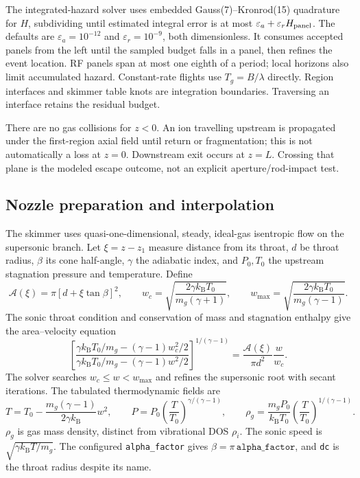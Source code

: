 \documentclass[10pt,a4paper]{article}
\newcommand{\kb}{k_{\mathrm B}}
\begin{document}
The integrated-hazard solver uses embedded Gauss(7)--Kronrod(15) quadrature
for $H$, subdividing until estimated integral error is at most
$\varepsilon_a+\varepsilon_r H_{\rm panel}$. The defaults are
$\varepsilon_a=10^{-12}$ and $\varepsilon_r=10^{-9}$, both dimensionless.
It consumes accepted panels from the left until the sampled budget falls in a
panel, then refines the event location. RF panels span at most one eighth of
a period; local horizons also limit accumulated hazard. Constant-rate flights
use $T_g=B/\lambda$ directly. Region interfaces and skimmer table knots are
integration boundaries. Traversing an interface retains the residual budget.

There are no gas collisions for $z<0$. An ion travelling upstream is propagated
under the first-region axial field until return or fragmentation; this is not
automatically a loss at $z=0$. Downstream exit occurs at $z=L$. Crossing that
plane is the modeled escape outcome, not an explicit aperture/rod-impact test.

\clearpage
\subsection{Nozzle preparation and interpolation}\label{sec:nozzle}
The skimmer uses quasi-one-dimensional, steady, ideal-gas isentropic flow on
the supersonic branch. Let $\xi=z-z_1$ measure distance from its throat,
$d$ be throat radius, $\beta$ its cone half-angle, $\gamma$ the adiabatic index,
and $P_0,T_0$ the upstream stagnation pressure and temperature. Define
\[
 \mathcal A(\xi)=\pi[d+\xi\tan\beta]^2,\qquad
 w_c=\sqrt{\frac{2\gamma\kb T_0}{m_g(\gamma+1)}},\qquad
 w_{\max}=\sqrt{\frac{2\gamma\kb T_0}{m_g(\gamma-1)}}.
\]
The sonic throat condition and conservation of mass and stagnation enthalpy
give the area--velocity equation
\begin{equation}
 \left[
 \frac{\gamma\kb T_0/m_g-(\gamma-1)w_c^2/2}
 {\gamma\kb T_0/m_g-(\gamma-1)w^2/2}
 \right]^{1/(\gamma-1)}
 =\frac{\mathcal A(\xi)}{\pi d^2}\frac{w}{w_c}.
\label{eq:nozzle}
\end{equation}
The solver searches $w_c\leq w<w_{\max}$ and refines the supersonic root with
secant iterations. The tabulated thermodynamic fields are
\[
 T=T_0-\frac{m_g(\gamma-1)}{2\gamma\kb}w^2,\qquad
 P=P_0\left(\frac T{T_0}\right)^{\gamma/(\gamma-1)},\qquad
 \rho_g=\frac{m_gP_0}{\kb T_0}
 \left(\frac T{T_0}\right)^{1/(\gamma-1)}.
\]
$\rho_g$ is gas mass density, distinct from vibrational DOS $\rho_i$.
The sonic speed is $\sqrt{\gamma\kb T/m_g}$. The configured
\texttt{alpha\_factor} gives $\beta=\pi\,\texttt{alpha\_factor}$, and
\texttt{dc} is the throat radius despite its name.
\end{document}
